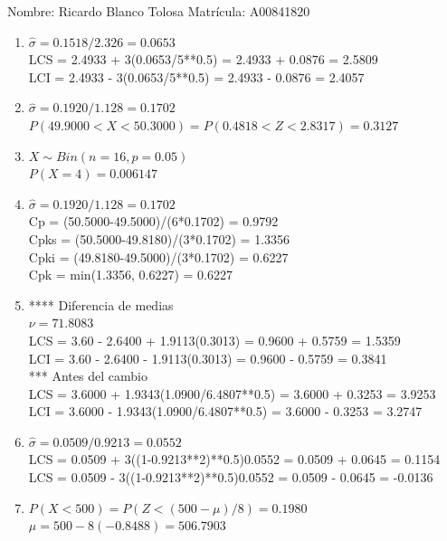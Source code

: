 \documentclass[8pt]{report}
\begin{document}
 \newpage

Nombre: \underline{\hspace*{.2in}}
Ricardo Blanco Tolosa
\underline{\hspace*{.2in}} \quad Matr\'icula:\underline{\hspace*{.2in}}
A00841820
\underline{\hspace*{.2in}} \\

\begin{enumerate}
\item $\hat\sigma = 0.1518/2.326 = 0.0653$\\
LCS = 2.4933 + 3(0.0653/5**0.5) = 2.4933 + 0.0876 = 2.5809\\
LCI = 2.4933 - 3(0.0653/5**0.5) = 2.4933 - 0.0876 = 2.4057
\item $\hat\sigma = 0.1920/1.128 = 0.1702$\\
$P(49.9000 < X < 50.3000) = P(0.4818 < Z < 2.8317) = 0.3127$\\
\item $X \sim Bin(n=16, p=0.05)$\\
$P(X = 4) = 0.006147$
\item $\hat\sigma = 0.1920/1.128 = 0.1702$\\
Cp = (50.5000-49.5000)/(6*0.1702) = 0.9792\\
Cpks = (50.5000-49.8180)/(3*0.1702) = 1.3356\\
Cpki = (49.8180-49.5000)/(3*0.1702) = 0.6227\\
Cpk = min(1.3356, 0.6227) = 0.6227
\item **** Diferencia de medias\\
$\nu = 71.8083$\\
LCS = 3.60 - 2.6400 + 1.9113(0.3013) = 0.9600 + 0.5759 = 1.5359\\
LCI = 3.60 - 2.6400 - 1.9113(0.3013) = 0.9600 - 0.5759 = 0.3841\\
*** Antes del cambio\\
LCS = 3.6000 + 1.9343(1.0900/6.4807**0.5) = 3.6000 + 0.3253 = 3.9253\\
LCI = 3.6000 - 1.9343(1.0900/6.4807**0.5) = 3.6000 - 0.3253 = 3.2747\\
\item $\hat\sigma = 0.0509/0.9213 = 0.0552$\\
LCS = 0.0509 + 3((1-0.9213**2)**0.5)0.0552 = 0.0509 + 0.0645 = 0.1154\\
LCS = 0.0509 - 3((1-0.9213**2)**0.5)0.0552 = 0.0509 - 0.0645 = -0.0136
\item $P(X < 500) = P(Z < (500-\mu)/8) = 0.1980$\\
$\mu = 500 - 8(-0.8488) = 506.7903$\\
\end{enumerate}

 \newpage
\end{document}
